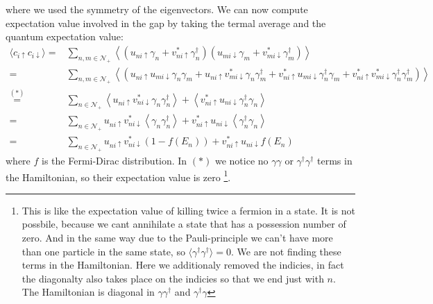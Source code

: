\documentclass[../main.tex]{subfile}
\begin{document}
where we used the symmetry of the eigenvectors. We can now compute expectation value involved in the gap by taking the termal average and the quantum expectation value:
\begin{equation}\label{eq:transfo_c_up_c_down_BdG}
\begin{aligned}
    \langle c_{i\uparrow}c_{i\downarrow} \rangle =& \sum_{n,m\in\mathcal{N}_+} \left\langle\left(u_{ni\uparrow}\gamma_n + v_{ni\uparrow}^{\ast}\gamma_{n}^{\dagger}\right)\left(u_{mi\downarrow}\gamma_m + v_{mi\downarrow}^{\ast}\gamma_{m}^{\dagger}\right)\right\rangle\\
     =&  \sum_{n,m\in\mathcal{N}_+} \left\langle\left(u_{ni\uparrow} u_{mi\downarrow}\gamma_n\gamma_m + u_{ni\uparrow} v_{mi\downarrow}^{\ast}\gamma_n\gamma_{m}^{\dagger} + v_{ni\uparrow}^{\ast}u_{mi\downarrow}\gamma_{n}^{\dagger} \gamma_m+  v_{ni\uparrow}^{\ast} v_{mi\downarrow}^{\ast}\gamma_{n}^{\dagger}\gamma_{m}^{\dagger}  \right)\right\rangle\\
     \stackrel{(\ast)}{=}&  \sum_{n\in\mathcal{N}_+} \left\langle u_{ni\uparrow} v_{ni\downarrow}^{\ast}\gamma_n\gamma_{n}^{\dagger}\right\rangle + \left\langle v_{ni\uparrow}^{\ast}u_{ni\downarrow}\gamma_{n}^{\dagger}\gamma_{n}\right\rangle\\     
     =&  \sum_{n\in\mathcal{N}_+} u_{ni\uparrow} v_{ni\downarrow}^{\ast}\left\langle\gamma_n\gamma_{n}^{\dagger}\right\rangle + v_{ni\uparrow}^{\ast}u_{ni\downarrow}\left\langle \gamma_{n}^{\dagger}\gamma_{n}\right\rangle\\
     =&  \sum_{n\in\mathcal{N}_+} u_{ni\uparrow} v_{ni\downarrow}^{\ast} \left(1-f(E_n)\right) + v_{ni\uparrow}^{\ast}u_{ni\downarrow}f(E_n)
\end{aligned}
\end{equation}
where $f$ is the Fermi-Dirac distribution. In $(\ast)$ we notice no $\gamma\gamma$ or $\gamma^{\dagger}\gamma^{\dagger}$ terms in the Hamiltonian, so their expectation 
value is zero
\footnote{This is like the expectation value of killing twice a fermion in a state. It is not possbile, because we cant annihilate a state that has a possession number of zero.
And in the same way due to the Pauli-principle we can't have more than one particle in the same state, so $\langle \gamma^{\dagger} \gamma^{\dagger} \rangle = 0$. We are not 
finding these terms in the Hamiltonian. Here we 
additionaly removed the indicies, in fact the diagonalty also takes place on the indicies so that we end just with $n$.
The Hamiltonian is diagonal in $\gamma\gamma^{\dagger}$ and $\gamma^{\dagger}\gamma$ }.
\end{document}
